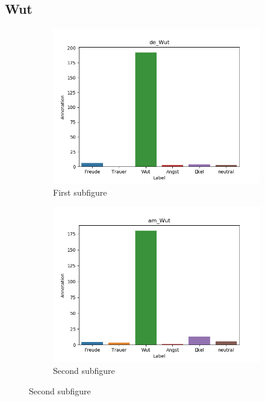 \documentclass[11pt,a4paper,headsepline,twoside,toc=bibliography]{scrreprt}
\begin{document}
\subsection{Wut}

\begin{figure}[t!] %
	\begin{subfigure}{0.48\textwidth}
		\includegraphics[width=\linewidth]{plots/de_Wut.png}
		\caption{First subfigure} \label{fig:de_W}
	\end{subfigure}\hspace*{\fill}
	\begin{subfigure}{0.48\textwidth}
		\includegraphics[width=\linewidth]{plots/am_Wut.png}
		\caption{Second subfigure} \label{fig:am_W}
	\end{subfigure}
	

\end{figure}
\end{document}
